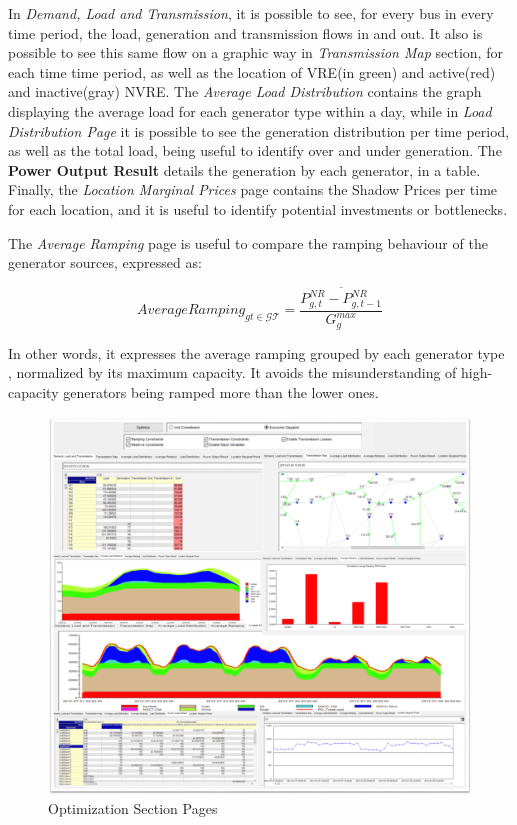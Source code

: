 \documentclass[12pt,LUDisStyle,twosided]{book}
\newcommand{\mc}{\mathcal}
\begin{document}
In \textit{Demand, Load and Transmission}, it is possible to see, for every bus in every time period, the load, generation and transmission flows in and out. It also is possible to see this same flow on a graphic way in \textit{Transmission Map} section, for each time time period, as well as the location of VRE(in green) and active(red) and inactive(gray) NVRE. The \textit{Average Load Distribution} contains the graph displaying the average load for each generator type within a day, while in \textit{Load Distribution Page} it is possible to see the generation distribution per time period, as well as the total load, being useful to identify over and under generation. The \textbf{Power Output Result} details the generation by each generator, in a table. Finally, the \textit{Location Marginal Prices} page contains the Shadow Prices per time for each location, and it is useful to identify potential investments or bottlenecks.

The \textit{Average Ramping} page is useful to compare the ramping behaviour of the generator sources, expressed as:

\begin{equation}
    AverageRamping_{gt \in \mc{GT}} = \overline{\dfrac{P^{NR}_{g,t} - P^{NR}_{g,t-1}}{G^{max}_{g}}}
\end{equation}

In other words, it expresses the average ramping grouped by each generator type , normalized by its maximum capacity. It avoids the misunderstanding of high-capacity generators being ramped more than the lower ones.

\begin{figure}[h] 
	\begin{center}
		\includegraphics[width=\textwidth,height=\textheight,keepaspectratio]{aimmsOptimizationSectionPages.png}
	  	\caption{Optimization Section Pages}
     	\label{fig:optimizationSectionPages}
	\end{center}
\end{figure}
\end{document}
